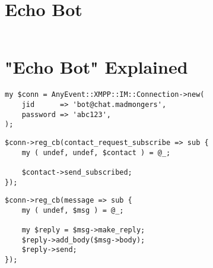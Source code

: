 \section{Echo Bot}

\pause

\begin{shaded}
\inputminted{perl}{examples/echo-bot.pl}
\end{shaded}

\newpage

\section{"Echo Bot" Explained}

\pause

\begin{shaded}
\begin{verbatim}
my $conn = AnyEvent::XMPP::IM::Connection->new(
    jid      => 'bot@chat.madmongers',
    password => 'abc123',
);
\end{verbatim}
\end{shaded}
\pause

\begin{shaded}
\begin{verbatim}
$conn->reg_cb(contact_request_subscribe => sub {
    my ( undef, undef, $contact ) = @_;

    $contact->send_subscribed;
});
\end{verbatim}
\end{shaded}

\newpage

\begin{shaded}
\begin{verbatim}
$conn->reg_cb(message => sub {
    my ( undef, $msg ) = @_;

    my $reply = $msg->make_reply;
    $reply->add_body($msg->body);
    $reply->send;
});
\end{verbatim}
\end{shaded}
